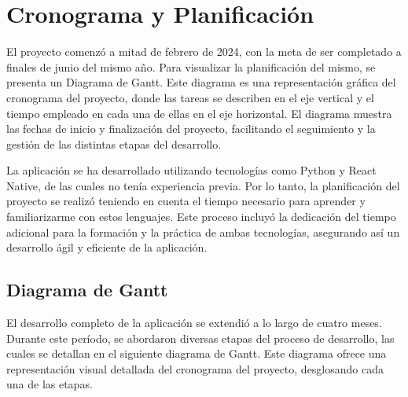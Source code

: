 \section{Cronograma y Planificación}

El proyecto comenzó a mitad de febrero de 2024, con la meta de ser completado a finales de junio del mismo año. Para visualizar la planificación del mismo, se presenta un Diagrama de Gantt. Este diagrama es una representación gráfica del cronograma del proyecto, donde las tareas se describen en el  eje vertical y el tiempo empleado en cada una de ellas en el eje horizontal. El diagrama muestra las fechas de inicio y finalización del proyecto, facilitando el seguimiento y la gestión de las distintas etapas del desarrollo.

La aplicación se ha desarrollado utilizando tecnologías como Python y React Native, de las cuales no tenía experiencia previa. Por lo tanto, la planificación del proyecto se realizó teniendo en cuenta el tiempo necesario para aprender y familiarizarme con estos lenguajes. Este proceso incluyó la dedicación del tiempo adicional para la formación y la práctica de ambas tecnologías, asegurando así un desarrollo ágil y eficiente de la aplicación.

\subsection{Diagrama de Gantt}

El desarrollo completo de la aplicación se extendió a lo largo de cuatro meses. Durante este período, se abordaron diversas etapas del proceso de desarrollo, las cuales se detallan en el siguiente diagrama de Gantt. Este diagrama ofrece una representación visual detallada del cronograma del proyecto, desglosando cada una de las etapas.

